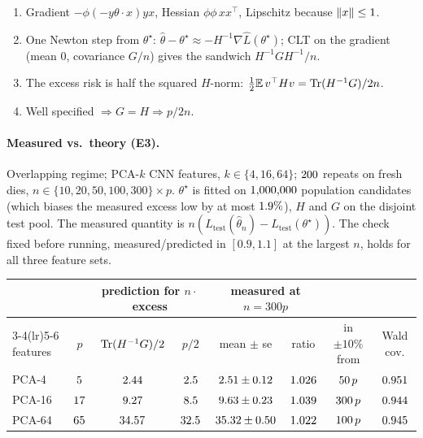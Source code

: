 \begin{inshort}
\begin{enumerate}[leftmargin=*]
  \item Gradient $-\phi(-y\theta\cdot x)yx$, Hessian $\phi\phi\,xx^\top$, Lipschitz because $\left\lVert x \right\rVert\le1$.
  \item One Newton step from $\theta^\star$: $\hat\theta-\theta^\star\approx-H^{-1}\nabla\hat L(\theta^\star)$;
    CLT on the gradient (mean 0, covariance $G/n$) gives the sandwich $H^{-1}GH^{-1}/n$.
  \item The excess risk is half the squared $H$-norm: $\frac12\mathbb{E}\,v^\top Hv=\operatorname{Tr}(H^{-1}G)/2n$.
  \item Well specified $\Rightarrow G=H\Rightarrow p/2n$.
\end{enumerate}
\end{inshort}

\paragraph{Measured vs.\ theory (E3).} Overlapping regime; PCA-$k$ CNN features, $k\in\{4,16,64\}$;
$200$ repeats on fresh dies, $n\in\{10,20,50,100,300\}\times p$. $\theta^\star$ is fitted on
$1{,}000{,}000$ population candidates (which biases the measured excess low by at most
$1.9\%$), $H$ and $G$ on the disjoint test pool. The measured quantity is
$n(L_{\text{test}}(\hat\theta_n)-L_{\text{test}}(\theta^\star))$. The check fixed before running,
measured/predicted in $[0.9,1.1]$ at the largest $n$, holds for all three feature sets.

\begin{center}
\small
\begin{tabular}{lccccccc}
\toprule
& & \multicolumn{2}{c}{prediction for $n\cdot$excess} & \multicolumn{2}{c}{measured at $n=300p$} & & \\
\cmidrule(lr){3-4}\cmidrule(lr){5-6}
features & $p$ & $\operatorname{Tr}(H^{-1}G)/2$ & $p/2$ & mean $\pm$ se & ratio & in $\pm10\%$ from & Wald cov. \\
\midrule
PCA-4 & $5$ & $2.44$ & $2.5$ & $2.51\pm0.12$ & $1.026$ & $50\,p$ & $0.951$ \\
PCA-16 & $17$ & $9.27$ & $8.5$ & $9.63\pm0.23$ & $1.039$ & $300\,p$ & $0.944$ \\
PCA-64 & $65$ & $34.57$ & $32.5$ & $35.32\pm0.50$ & $1.022$ & $100\,p$ & $0.945$ \\
\bottomrule
\end{tabular}
\end{center}

